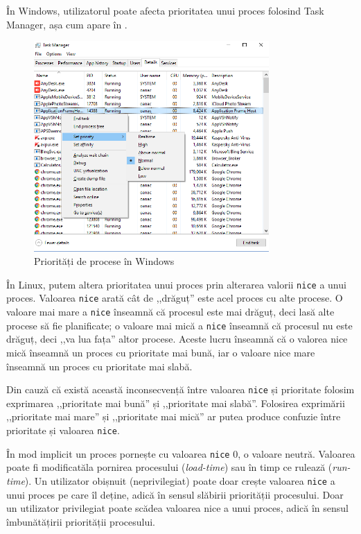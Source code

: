 În Windows, utilizatorul poate afecta prioritatea unui proces folosind Task Manager, așa cum apare în .

\begin{figure}[!htbp]
	\centering
	\includegraphics[width=0.8\textwidth]{chapters/04-process/img/task-manager-priority.png}
	\caption{Priorități de procese în Windows}
	\label{fig:process-priority-task-manager}
\end{figure}

În Linux, putem altera prioritatea unui proces prin alterarea valorii \texttt{nice} a
unui proces. Valoarea \texttt{nice} arată cât de ,,drăguț'' este acel proces cu alte
procese. O valoare mai mare a \texttt{nice} înseamnă că procesul este mai drăguț, deci
lasă alte procese să fie planificate; o valoare mai mică a \texttt{nice} înseamnă că
procesul nu este drăguț, deci ,,va lua fața'' altor procese. Aceste lucru înseamnă
că o valorea nice mică înseamnă un proces cu prioritate mai bună, iar o valoare
nice mare înseamnă un proces cu prioritate mai slabă.

\begin{note}
Din cauză că există această inconsecvență între valoarea \texttt{nice} și prioritate
folosim exprimarea ,,prioritate mai bună'' și ,,prioritate mai slabă''.
Folosirea exprimării ,,prioritate mai mare'' și ,,prioritate mai mică'' ar
putea produce confuzie între prioritate și valoarea \texttt{nice}.
\end{note}

În mod implicit un proces pornește cu valoarea \texttt{nice} 0, o valoare neutră.
Valoarea poate fi modificatăla pornirea procesului (\textit{load-time}) sau în timp ce
rulează (\textit{run-time}). Un utilizator obișnuit (neprivilegiat) poate doar crește
valoarea \texttt{nice} a unui proces pe care îl deține, adică în sensul slăbirii
priorității procesului. Doar un utilizator privilegiat poate scădea valoarea
nice a unui proces, adică în sensul îmbunătățirii priorității procesului.

